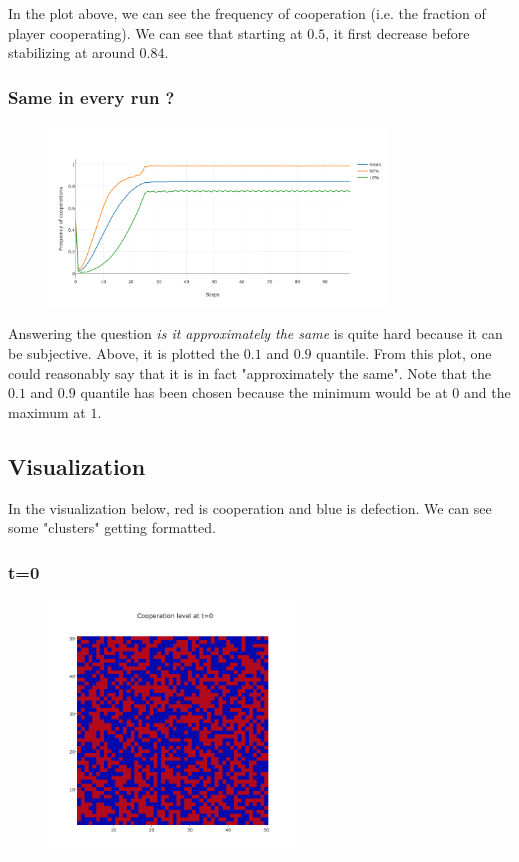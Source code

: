\documentclass[11pt]{article}
\begin{document}
In the plot above, we can see the frequency of cooperation (i.e. the fraction of player cooperating). We can see that starting at $0.5$, it first decrease before stabilizing at around $0.84$.

\subsubsection{Same in every run ?}

\begin{figure}[H]
\centering
   \includegraphics[width=0.8\textwidth]{img/part1/cf-moore-notmyself-90-10.png}
\end{figure}

Answering the question \textit{is it approximately the same} is quite hard because it can be subjective. Above, it is plotted the $0.1$ and $0.9$ quantile. From this plot, one could reasonably say that it is in fact "approximately the same". Note that the $0.1$ and $0.9$ quantile has been chosen because the minimum would be at $0$ and the maximum at $1$.

\subsection{Visualization}

In the visualization below, red is cooperation and blue is defection. We can see some "clusters" getting formatted.

\subsubsection{t=0}

\begin{figure}[H]
\centering
   \includegraphics[width=0.6\textwidth]{img/part1/cf-moore-visu-0.png}
\end{figure}
\end{document}
